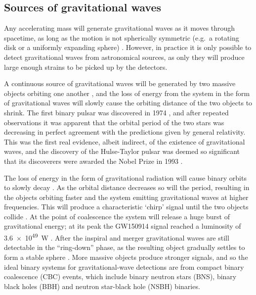 
\subsection{Sources of gravitational waves}
\label{sec:gw_sources}
\begin{colsection}

Any accelerating mass will generate gravitational waves as it moves through spacetime, as long as the motion is not spherically symmetric (e.g.\ a rotating disk or a uniformly expanding sphere) \citep{BIGcardiff,BIGparis}. However, in practice it is only possible to detect gravitational waves from astronomical sources, as only they will produce large enough strains to be picked up by the detectors.

A continuous source of gravitational waves will be generated by two massive objects orbiting one another \citep{GW_sources}, and the loss of energy from the system in the form of gravitational waves will slowly cause the orbiting distance of the two objects to shrink. The first binary pulsar was discovered in 1974 \citep{HulseTaylor}, and after repeated observations it was apparent that the orbital period of the two stars was decreasing in perfect agreement with the predictions given by general relativity. This was the first real evidence, albeit indirect, of the existence of gravitational waves, and the discovery of the Hulse-Taylor pulsar was deemed so significant that its discoverers were awarded the Nobel Prize in 1993 \citep{HulseTaylor2}.

The loss of energy in the form of gravitational radiation will cause binary orbits to slowly decay \citep[unless counteracted by another process, such as mass transfer;][]{binary_masstransfer}. As the orbital distance decreases so will the period, resulting in the objects orbiting faster and the system emitting gravitational waves at higher frequencies. This will produce a characteristic `chirp' signal until the two objects collide \citep{GW_sources, BIGparis}. At the point of coalescence the system will release a huge burst of gravitational energy; at its peak the GW150914 signal reached a luminosity of \SI{3.6e49}{\watt} \citep[greater than the combined luminosity of all stars in the observable universe;][]{GW150914}. After the inspiral and merger gravitational waves are still detectable in the ``ring-down'' phase, as the resulting object gradually settles to form a stable sphere \citep{GW_ringdown}. More massive objects produce stronger signals, and so the ideal binary systems for gravitational-wave detections are from compact binary coalescence (CBC)  events, which include binary neutron stars  (BNS), binary black holes  (BBH) and neutron star-black hole (NSBH)  binaries.


\end{colsection}
